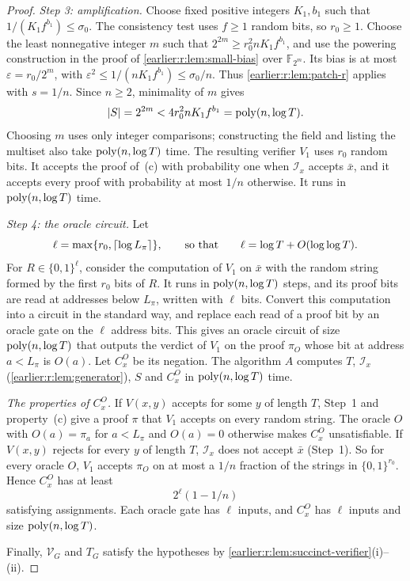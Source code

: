 \begin{proof}
\emph{Step 3: amplification.} Choose fixed positive integers
\(K_1,b_1\) such that \(1/(K_1f^{b_1})\le\sigma_0\).
The consistency test uses \(f\ge1\) random bits, so \(r_0\ge1\).
Choose the least nonnegative integer \(m\) such that
\(2^{2m}\ge r_0^2nK_1f^{b_1}\), and use the powering construction
in the proof of \cref{earlier:r:lem:small-bias} over \(\mathbb F_{2^m}\).
Its bias is at most \(\varepsilon=r_0/2^m\), with
\(\varepsilon^2\le1/(nK_1f^{b_1})\le\sigma_0/n\).
Thus \cref{earlier:r:lem:patch-r} applies with \(s=1/n\). Since \(n\ge2\),
minimality of \(m\) gives
\[
 \left|S\right|=2^{2m}<4r_0^2nK_1f^{b_1}=\operatorname{poly}(n,\log T).
\]
Choosing \(m\) uses only integer comparisons; constructing the field
and listing the multiset also take \(\operatorname{poly}(n,\log T)\) time.
The resulting verifier \(V_1\) uses \(r_0\) random bits. It accepts the
proof of~(c) with probability one when \(\mathcal I_x\) accepts
\(\bar x\), and it accepts every proof with
probability at most \(1/n\) otherwise. It runs in \(\operatorname{poly}(n,\log T)\)
time.

\emph{Step 4: the oracle circuit.} Let
\[
 \ell=\max\{r_0,\left\lceil\log L_\pi\right\rceil\},\qquad\text{so that}\qquad
 \ell=\log T+O(\log\log T).
\]
For \(R\in\{0,1\}^\ell\), consider the computation of \(V_1\) on
\(\bar x\) with the random string formed by the first \(r_0\) bits of
\(R\). It runs in \(\operatorname{poly}(n,\log T)\) steps, and its proof bits are read
at addresses below \(L_\pi\), written with \(\ell\) bits. Convert this
computation into a circuit in the standard way, and replace each read of
a proof bit by an oracle gate on the \(\ell\) address bits. This gives
an oracle circuit of size \(\operatorname{poly}(n,\log T)\) that outputs the verdict
of \(V_1\) on the proof \(\pi_O\) whose bit at address \(a<L_\pi\) is
\(O(a)\). Let \(C^O_x\) be its negation. The algorithm \(A\) computes
\(T\), \(\mathcal I_x\) (\cref{earlier:r:lem:generator}), \(S\) and \(C^O_x\) in
\(\operatorname{poly}(n,\log T)\) time.

\emph{The properties of \(C^O_x\).} If \(V(x,y)\) accepts for some \(y\)
of length \(T\), Step~1 and property~(c) give a proof \(\pi\) that
\(V_1\) accepts on every random string. The oracle \(O\) with
\(O(a)=\pi_a\) for \(a<L_\pi\) and \(O(a)=0\) otherwise makes \(C^O_x\)
unsatisfiable. If \(V(x,y)\) rejects for every \(y\) of length \(T\),
\(\mathcal I_x\) does not accept \(\bar x\) (Step~1). So for every
oracle \(O\), \(V_1\) accepts \(\pi_O\) on at most a \(1/n\) fraction of
the strings in \(\{0,1\}^{r_0}\). Hence \(C^O_x\) has at least
\[
 2^\ell(1-1/n)
\]
satisfying assignments. Each oracle gate has \(\ell\) inputs, and
\(C^O_x\) has \(\ell\) inputs and size \(\operatorname{poly}(n,\log T)\).

Finally, \(\mathcal V_G\) and \(T_G\) satisfy the hypotheses by
\cref{earlier:r:lem:succinct-verifier}(i)--(ii).
\end{proof}

